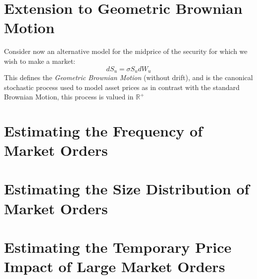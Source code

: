 \section{Extension to Geometric Brownian Motion}
Consider now an alternative model for the midprice of the security for 
which we wish to make a market:
$$dS_u=\sigma S_udW_u$$
This defines the \textit{Geometric Brownian Motion} (without drift), and
is the canonical stochastic process used to model asset prices as in
contrast with the standard Brownian Motion, this process is valued in $\mathbb{R}^+$
\section{Estimating the Frequency of Market Orders}
\section{Estimating the Size Distribution of Market Orders}
\section{Estimating the Temporary Price Impact of Large Market Orders}